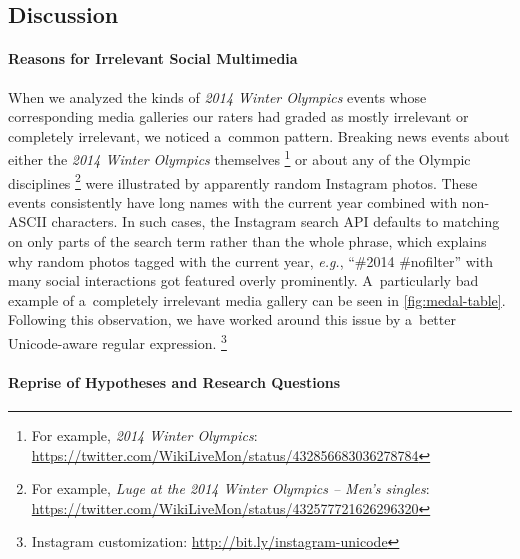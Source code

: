 \documentclass{sig-alternate-somus}
\newcommand{\inlinelistingsize}{\fontsize{8pt}{11pt}}
\let\oldurl\url
\renewcommand{\url}[1]{\inlinelistingsize\oldurl{#1}}
\begin{document}
\subsection{Discussion}
\label{sec:discussion}

\paragraph{Reasons for Irrelevant Social Multimedia}

When we analyzed the kinds of \emph{2014 Winter Olympics} events
whose corresponding media galleries our raters
had graded as mostly irrelevant or completely irrelevant,
we noticed a~common pattern.
Breaking news events about either the
\emph{2014 Winter Olympics} themselves%
\footnote{For example, \emph{2014 Winter Olympics}:
\url{https://twitter.com/WikiLiveMon/status/432856683036278784}}
or about any of the Olympic disciplines%
\footnote{For example, \emph{Luge at the 2014 Winter Olympics -- Men's singles}:
\url{https://twitter.com/WikiLiveMon/status/432577721626296320}}
were illustrated by apparently random Instagram photos. 
These events consistently have long names with the current year
combined with non-ASCII characters.
In such cases, the Instagram search API defaults to matching
on only parts of the search term rather than the whole phrase,
which explains why random photos tagged with the current year,
\emph{e.g.}, ``\#2014 \#nofilter'' with many social interactions
got featured overly prominently.
A~particularly bad example of a~completely irrelevant media gallery
can be seen in \autoref{fig:medal-table}.
Following this observation, we have worked around this issue
by a~better Unicode-aware regular expression.%
\footnote{Instagram customization:
\url{http://bit.ly/instagram-unicode}}

\paragraph{Reprise of Hypotheses and Research Questions}
\end{document}
